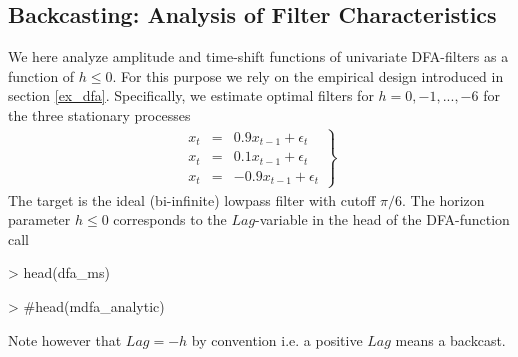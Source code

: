\documentclass[a4paper]{book}
\begin{document}
\subsection{Backcasting: Analysis of Filter Characteristics}\label{back_fil}

We here analyze amplitude and time-shift functions of univariate DFA-filters as a function of $h\leq 0$. For this purpose we rely on the empirical design introduced in section \ref{ex_dfa}. Specifically, we estimate optimal filters for $h=0,-1,...,-6$ for the three stationary processes
\begin{eqnarray}
\left.\begin{array}{ccc}x_t&=&0.9x_{t-1}+\epsilon_t\\
x_t&=&0.1x_{t-1}+\epsilon_t\\
x_t&=&-0.9x_{t-1}+\epsilon_t
\end{array}\right\}\label{ar1_processes}
\end{eqnarray}
The target is the ideal (bi-infinite) lowpass filter with cutoff $\pi/6$. The horizon parameter $h\leq 0$ corresponds to the $Lag$-variable in the head of the DFA-function call
\begin{Schunk}
\begin{Sinput}
> head(dfa_ms)
\end{Sinput}
\begin{Soutput}
1 function (L, periodogram, Lag, Gamma)                            
2 {                                                                
3     K <- length(periodogram) - 1                                 
4     X <- exp(-(0+1i) * Lag * pi * (0:(K))/(K)) * rep(1, K + 1) * 
5         sqrt(periodogram)                                        
6     X_y <- exp(-(0+1i) * Lag * pi * (0:(K))/(K)) * rep(1, K +    
\end{Soutput}
\begin{Sinput}
> #head(mdfa_analytic)
\end{Sinput}
\end{Schunk}
Note however that $Lag=-h$ by convention i.e. a positive $Lag$ means a backcast. 
\end{document}
